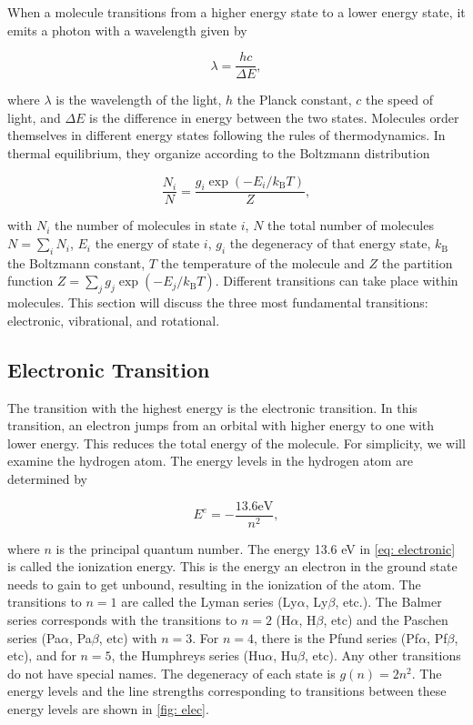 \documentclass[oneside, single, authoryear, semicolon, 12pt]{lion-msc}
\newcommand{\4}{$_4$}
\newcommand{\3}{$_3$}
\newcommand{\2}{$_2$}
\begin{document}
When a molecule transitions from a higher energy state to a lower energy state, it emits a photon with a wavelength given by

\begin{equation}
    \lambda=\frac{hc}{\Delta E},
\end{equation}

where $\lambda$ is the wavelength of the light, $h$ the Planck constant, $c$ the speed of light, and $\Delta E$ is the difference in energy between the two states. Molecules order themselves in different energy states following the rules of thermodynamics. In thermal equilibrium, they organize according to the Boltzmann distribution 

\begin{equation}
    \frac{N_i}{N}=\frac{g_i\exp{(-E_i/k_\mathrm{B}T)}}{Z},
    \label{eq: boltzmann}
\end{equation}

with $N_i$ the number of molecules in state $i$, $N$ the total number of molecules $N=\sum_iN_i$, $E_i$ the energy of state $i$, $g_i$ the degeneracy of that energy state, $k_\mathrm{B}$ the Boltzmann constant, $T$ the temperature of the molecule and $Z$ the partition function $Z=\sum_j g_j\exp{(-E_j/k_\mathrm{B}T)}$.
Different transitions can take place within molecules. This section will discuss the three most fundamental transitions: electronic, vibrational, and rotational.

\subsection{Electronic Transition}
The transition with the highest energy is the electronic transition. In this transition, an electron jumps from an orbital with higher energy to one with lower energy. This reduces the total energy of the molecule. For simplicity, we will examine the hydrogen atom. The energy levels in the hydrogen atom are determined by

\begin{equation}
    E^e=-\frac{13.6\mathrm{ eV}}{n^2},
    \label{eq: electronic}
\end{equation}

where $n$ is the principal quantum number. The energy 13.6 eV in \autoref{eq: electronic} is called the ionization energy. This is the energy an electron in the ground state needs to gain to get unbound, resulting in the ionization of the atom. The transitions to $n=1$ are called the Lyman series (Ly$\alpha$, Ly$\beta$, etc.). The Balmer series corresponds with the transitions to $n=2$ (H$\alpha$, H$\beta$, etc) and the Paschen series (Pa$\alpha$, Pa$\beta$, etc) with $n=3$. For $n=4$, there is the Pfund series (Pf$\alpha$, Pf$\beta$, etc), and for $n=5$, the Humphreys series (Hu$\alpha$, Hu$\beta$, etc). Any other transitions do not have special names. The degeneracy of each state is $g(n)=2n^2$. The energy levels and the line strengths corresponding to transitions between these energy levels are shown in \autoref{fig: elec}.
\end{document}
